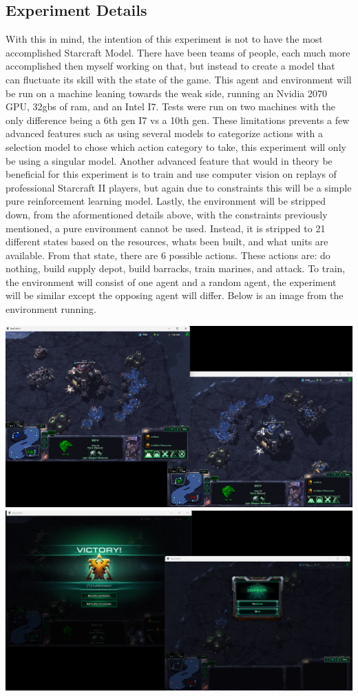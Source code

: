 \subsection{Experiment Details}

With this in mind, the intention of this experiment is not to have the most accomplished Starcraft Model. There have been teams of people, each much more accomplished then myself working on that, but instead to create a model that can fluctuate its
skill with the state of the game. This agent and environment will be run on a machine leaning towards the weak side, running an Nvidia 2070 GPU, 32gbs of ram, and an Intel I7. Tests were run on two machines with the only difference being a 6th gen I7 vs a 10th gen.
These limitations prevents a few advanced features such as using several models to categorize actions with a selection model to chose which action category to take, this experiment will only be using a singular model. Another advanced feature that would in theory
be beneficial for this experiment is to train and use computer vision on replays of professional Starcraft II players, but again due to constraints this will be a simple pure reinforcement learning model. Lastly, the environment will be stripped down, from the
aformentioned details above, with the constraints previously mentioned, a pure environment cannot be used. Instead, it is stripped to 21 different states based on the resources, whats been built, and what units are available. From that state, there are 6 possible
actions. These actions are: do nothing, build supply depot, build barracks, train marines, and attack.  To train, the environment will consist of one agent and a random agent, the experiment will be similar except the opposing agent will differ. Below is an 
image from the environment running.

\includegraphics[width=.5\textwidth]{images/sc2env.png}
\includegraphics[width=.5\textwidth]{images/victory_screen.png}

